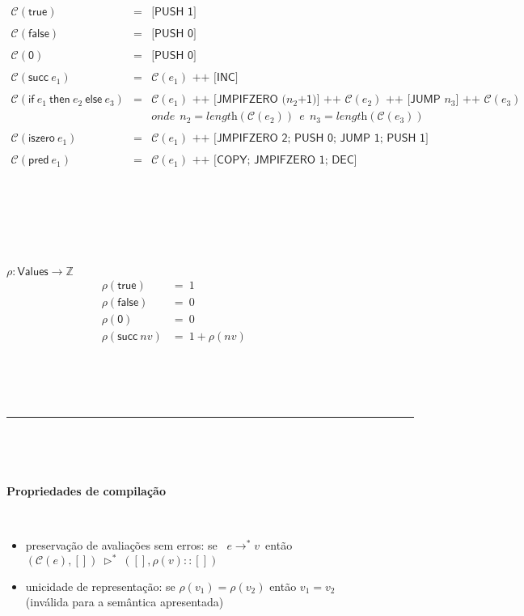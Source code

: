 \documentclass[10pt,a4paper]{article}
\begin{document}
\[
\begin{array}{lcl}
\mathcal{C}( \textsf{true}) & = &  \textsf{[PUSH 1]}\\ \\   
\mathcal{C}( \textsf{false}) & = &  \textsf{[PUSH 0]}\\  \\  
\mathcal{C}( \textsf{0}) & = &  \textsf{[PUSH 0]}\\     \\
\mathcal{C}( \textsf{succ}\ e_1) & = & \mathcal{C}( {e}_1)  \textsf{ ++ }  \textsf{[INC]}\\    \\
\mathcal{C}( \textsf{if}\   {e}_1\  \textsf{then}\  {e}_2 \ \textsf{else}\  {e}_3) &=&  \mathcal{C}( {e}_1)  \textsf{ ++ }  \textsf{[JMPIFZERO ($n_2$+1)]}  \textsf{ ++ }  \mathcal{C}( {e}_2)  \textsf{ ++ }  \textsf{[JUMP $n_3$]} \textsf{ ++ }  \mathcal{C}( {e}_3) \\  
&& \textit{onde}\ \  {n}_2 =  \textit{length}(\mathcal{C}( {e}_2))\ \ \textit{e}\  \ {n}_3 =  \textit{length}(\mathcal{C}( {e}_3))\\   \\
\mathcal{C}( \textsf{iszero}\ e_1) & = & \mathcal{C}( {e}_1)
 \textsf{ ++ }  \textsf{[JMPIFZERO 2; PUSH 0; JUMP 1; PUSH 1]}\\    \\
 \mathcal{C}( \textsf{pred}\ e_1) & = & \mathcal{C}( {e}_1)
 \textsf{ ++ }  \textsf{[COPY; JMPIFZERO 1; DEC]}\\ 
\end{array}
\]



\ 

\ 


\ 

$\rho : \textsf{Values} \to \mathbb{Z}$ 
\begin{align*}
\rho(\textsf{true})     & =\  1 &&&&&&&&\\  
\rho(\textsf{false})    & =\  0 \\
\rho(\textsf{0})        & =\  0 \\
\rho(\textsf{succ}\ nv) & =\  1 + \rho(nv) \\
\end{align*}

\ 

\ 


\hrule 

\ 

\ 


\noindent \textbf{Propriedades de compilação}

\ 

\begin{itemize}
    \item preservação de avaliações sem erros: se \ $e \longrightarrow^* v$\ então\ $ (\mathcal C(e),[]) ~\rhd^*~ ([],\rho(v)::[])$
    \item unicidade de representação: se $\rho(v_1) = \rho(v_2)$ então $v_1=v_2$\\ (inválida para a semântica apresentada)
\end{itemize}
\end{document}
